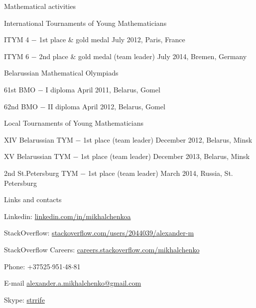 \documentclass{resume} %
\begin{document}
\begin{rSection}{Mathematical activities}

\begin{rSubsection}{International Tournaments of Young Mathematicians}{}{}

\item ITYM 4 $-$ 1st place \& gold medal \hfill July 2012, Paris, France
\item ITYM 6 $-$ 2nd place \& gold medal (team leader) \hfill July 2014, Bremen, Germany

\end{rSubsection}

\begin{rSubsection}{Belarussian Mathematical Olympiads}{}{}

\item 61st BMO $-$ I diploma \hfill  April 2011, Belarus, Gomel
\item 62nd BMO $-$ II diploma \hfill April 2012, Belarus, Gomel
\end{rSubsection}


\begin{rSubsection}{Local Tournaments of Young Mathematicians}{}{}

\item XIV Belarussian TYM $-$ 1st place (team leader) \hfill December 2012, Belarus, Minsk
\item XV Belarussian TYM $-$ 1st place (team leader) \hfill December 2013, Belarus, Minsk
\item 2nd St.Petersburg TYM $-$ 1st place (team leader) \hfill March 2014, Russia, St. Petersburg
\end{rSubsection}

\end{rSection}

\clearpage

\begin{rSection}{Links and contacts}

\item Linkedin: \href{http://linkedin.com/in/mikhalchenkoa}{linkedin.com/in/mikhalchenkoa}
\item StackOverflow: \href{http://stackoverflow.com/users/2044039/alexander-m}{stackoverflow.com/users/2044039/alexander-m}
\item StackOverflow Careers: \href{http://careers.stackoverflow.com/mikhalchenko}{careers.stackoverflow.com/mikhalchenko}
\item Phone: +37525$\cdot$951$\cdot$48$\cdot$81
\item E-mail \href{mailto:alexander.a.mikhalchenko@gmail.com}{alexander.a.mikhalchenko@gmail.com}
\item Skype: \href{skype:strrife}{strrife}
\end{rSection}
\end{document}
